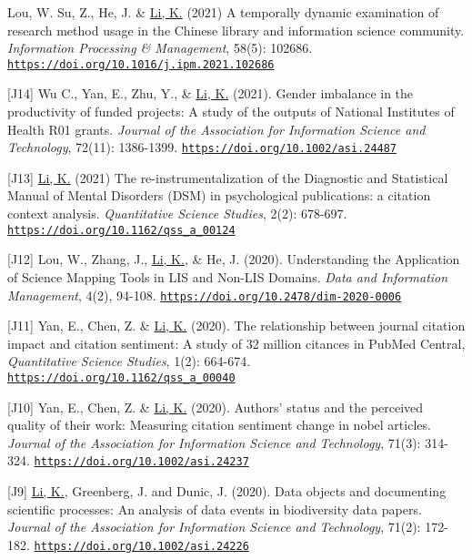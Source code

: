 \documentclass[margin, 10pt]{res} %
\begin{document}
\begin{resume}
[J15] Lou, W. Su, Z., He, J. \& \underline{Li, K.} (2021) A temporally dynamic examination of research method usage in the Chinese library and information science community. \textit{Information Processing \& Management}, 58(5): 102686. \href{https://doi.org/10.1016/j.ipm.2021.102686}{\nolinkurl{https://doi.org/10.1016/j.ipm.2021.102686}} 

[J14] Wu C., Yan, E., Zhu, Y., \& \underline{Li, K.} (2021). Gender imbalance in the productivity of funded projects: A study of the outputs of National Institutes of Health R01 grants. \textit{Journal of the Association for Information Science and Technology}, 72(11): 1386-1399. \href{https://doi.org/10.1002/asi.24487}{\nolinkurl{https://doi.org/10.1002/asi.24487}}

[J13] \underline{Li, K.} (2021) The re-instrumentalization of the Diagnostic and Statistical Manual of Mental Disorders (DSM) in psychological publications: a citation context analysis. \textit{Quantitative Science Studies}, 2(2): 678-697. \href{https://doi.org/10.1162/qss_a_00124}{\nolinkurl{https://doi.org/10.1162/qss_a_00124}}

[J12] Lou, W., Zhang, J., \underline{Li, K.}, \& He, J. (2020). Understanding the Application of Science Mapping Tools in LIS and Non-LIS Domains. \textit{Data and Information Management}, 4(2), 94-108. \href{https://doi.org/10.2478/dim-2020-0006}{\nolinkurl{https://doi.org/10.2478/dim-2020-0006}}

[J11] Yan, E., Chen, Z. \& \underline{Li, K.} (2020). The relationship between journal citation impact and citation sentiment: A study of 32 million citances in PubMed Central, \textit{Quantitative Science Studies}, 1(2): 664-674. \href{https://doi.org/10.1162/qss\_a\_00040}{\nolinkurl{https://doi.org/10.1162/qss_a_00040}}

[J10] Yan, E., Chen, Z. \& \underline{Li, K.} (2020). Authors' status and the perceived quality of their work: Measuring citation sentiment change in nobel articles. \textit{Journal of the Association for Information Science and Technology}, 71(3): 314-324. \href{https://doi.org/10.1002/asi.24237}{\nolinkurl{https://doi.org/10.1002/asi.24237}}

[J9] \underline{Li, K.}, Greenberg, J. and Dunic, J. (2020). Data objects and documenting scientific processes: An analysis of data events in biodiversity data papers. \textit{Journal of the Association for Information Science and Technology}, 71(2): 172-182. \href{https://doi.org/10.1002/asi.24226}{\nolinkurl{https://doi.org/10.1002/asi.24226}}


\end{resume}
\end{document}
